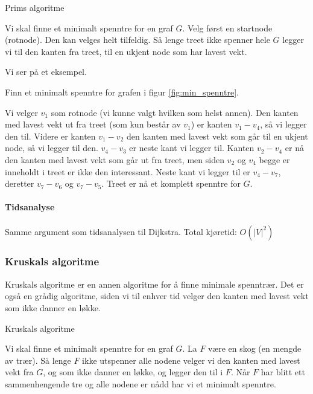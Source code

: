 \begin{theorem} Prims algoritme

Vi skal finne et minimalt spenntre for en graf $ G $. Velg først en startnode (rotnode). Den kan velges helt tilfeldig. Så lenge treet ikke spenner hele $ G $ legger vi til den kanten fra treet, til en ukjent node som har lavest vekt.
\end{theorem}
\noindent Vi ser på et eksempel.
\begin{example} Finn et minimalt spenntre for grafen i figur \ref{fig:min_spenntre}.

Vi velger $ v_1 $ som rotnode (vi kunne valgt hvilken som helst annen). Den kanten med lavest vekt ut fra treet (som kun består av $ v_1 $) er kanten $ v_1-v_4 $, så vi legger den til. Videre er kanten $ v_1-v_2 $ den kanten med lavest vekt som går til en ukjent node, så vi legger til den. $ v_4-v_3 $ er neste kant vi legger til. Kanten $ v_2-v_4 $ er nå den kanten med lavest vekt som går ut fra treet, men siden $ v_2 $ og $ v_4 $ begge er inneholdt i treet er ikke den interessant. Neste kant vi legger til er $ v_4-v_7 $, deretter $ v_7-v_6 $ og $ v_7-v_5 $. Treet er nå et komplett spenntre for $ G $. 
\end{example}

\paragraph{Tidsanalyse}
Samme argument som tidsanalysen til Dijkstra. Total kjøretid: $ O\left(|V|^2\right) $


\subsubsection{Kruskals algoritme}
\label{kruskal}

Kruskals algoritme er en annen algoritme for å finne minimale spenntrær. Det er også en grådig algoritme, siden vi til enhver tid velger den kanten med lavest vekt som ikke danner en løkke.

\begin{theorem} Kruskals algoritme

Vi skal finne et minimalt spenntre for en graf $ G $. La $ F $ være en skog (en mengde av trær). Så lenge $ F $ ikke utspenner alle nodene velger vi den kanten med lavest vekt fra $ G $, og som ikke danner en løkke, og legger den til i $ F $. Når $ F $ har blitt ett sammenhengende tre og alle nodene er nådd har vi et minimalt spenntre.
\end{theorem}

